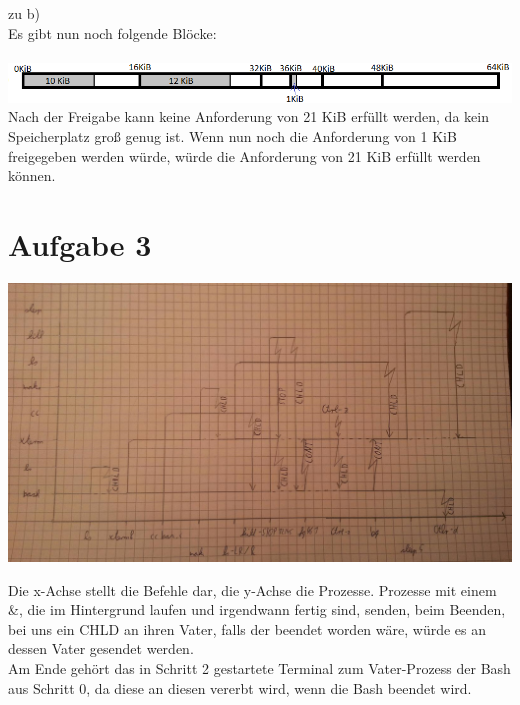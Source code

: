 \documentclass{ti2}
\begin{document}
zu b)\\
Es gibt nun noch folgende Blöcke: \\\\
\includegraphics[width=1.05\textwidth]{Aufgabe2b.png} 
Nach der Freigabe kann keine Anforderung von 21 KiB erfüllt werden, da kein Speicherplatz groß genug ist. Wenn nun noch die Anforderung von 1 KiB freigegeben werden würde, würde die Anforderung von 21 KiB erfüllt werden können.

\section*{Aufgabe 3}
\includegraphics[width=\textwidth]{aufgabe3}

Die x-Achse stellt die Befehle dar, die y-Achse die Prozesse. Prozesse mit einem \&, die im Hintergrund laufen und irgendwann fertig sind, senden, beim Beenden, bei uns ein CHLD an ihren Vater, falls der beendet worden wäre, würde es an dessen Vater gesendet werden.\\
Am Ende gehört das in Schritt 2 gestartete Terminal zum Vater-Prozess der Bash aus Schritt 0, da diese an diesen vererbt wird, wenn die Bash beendet wird.
\end{document}

